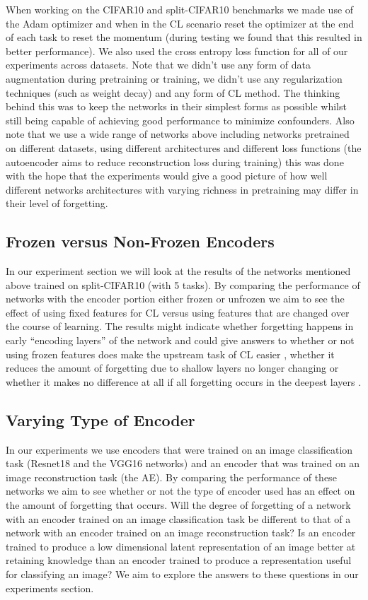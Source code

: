 When working on the CIFAR10 and split-CIFAR10 benchmarks we made use of the Adam optimizer \cite{kingma2014adam} and when in the CL scenario reset the optimizer at the end of each task to reset the momentum (during testing we found that this resulted in better performance). We also used the cross entropy loss function for all of our experiments across datasets. Note that we didn't use any form of data augmentation during pretraining or training, we didn't use any regularization techniques (such as weight decay) and any form of CL method. The thinking behind this was to keep the networks in their simplest forms as possible whilst still being capable of achieving good performance to minimize confounders. Also note that we use a wide range of networks above including networks pretrained on different datasets, using different architectures and different loss functions (the autoencoder aims to reduce reconstruction loss during training) this was done with the hope that the experiments would give a good picture of how well different networks architectures with varying richness in pretraining may differ in their level of forgetting. 

\subsection{Frozen versus Non-Frozen Encoders}
In our experiment section we will look at the results of the networks mentioned above trained on split-CIFAR10 (with 5 tasks). By comparing the performance of networks with the encoder portion either frozen or unfrozen we aim to see the effect of using fixed features for CL versus using features that are changed over the course of learning. The results might indicate whether forgetting happens in early ``encoding layers'' of the network and could give answers to whether or not using frozen features does make the upstream task of CL easier \cite{ostapenko2022continual}, whether it reduces the amount of forgetting due to shallow layers no longer changing \cite{rebuffi2017icarl, li2017learning} or whether it makes no difference at all if all forgetting occurs in the deepest layers \cite{ramasesh2020anatomy}. 

\subsection{Varying Type of Encoder}
In our experiments we use encoders that were trained on an image classification task (Resnet18 and the VGG16 networks) and an encoder that was trained on an image reconstruction task (the AE). By comparing the performance of these networks we aim to see whether or not the type of encoder used has an effect on the amount of forgetting that occurs. Will the degree of forgetting of a network with an encoder trained on an image classification task be different to that of a network with an encoder trained on an image reconstruction task? Is an encoder trained to produce a low dimensional latent representation of an image better at retaining knowledge than an encoder trained to produce a representation useful for classifying an image? We aim to explore the answers to these questions in our experiments section.


